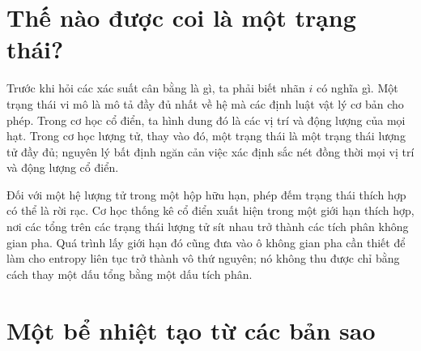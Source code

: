 \begin{classroomqa}
\end{classroomqa}

\section{Thế nào được coi là một trạng thái?}

Trước khi hỏi các xác suất cân bằng là gì, ta phải biết nhãn \(i\) có
nghĩa gì. Một trạng thái vi mô là mô tả đầy đủ nhất về hệ mà các định luật
vật lý cơ bản cho phép. Trong cơ học cổ điển, ta hình dung đó là các vị trí
và động lượng của mọi hạt. Trong cơ học lượng tử, thay vào đó, một trạng thái
là một trạng thái lượng tử đầy đủ; nguyên lý bất định ngăn cản việc xác định
sắc nét đồng thời mọi vị trí và động lượng cổ điển.

Đối với một hệ lượng tử trong một hộp hữu hạn, phép đếm trạng thái thích
hợp có thể là rời rạc. Cơ học thống kê cổ điển xuất hiện trong một giới hạn
thích hợp, nơi các tổng trên các trạng thái lượng tử sít nhau trở thành các
tích phân không gian pha. Quá trình lấy giới hạn đó cũng đưa vào ô không gian
pha cần thiết để làm cho entropy liên tục trở thành vô thứ nguyên; nó không
thu được chỉ bằng cách thay một dấu tổng bằng một dấu tích phân.

\begin{classroomqa}
\end{classroomqa}

\section{Một bể nhiệt tạo từ các bản sao}

